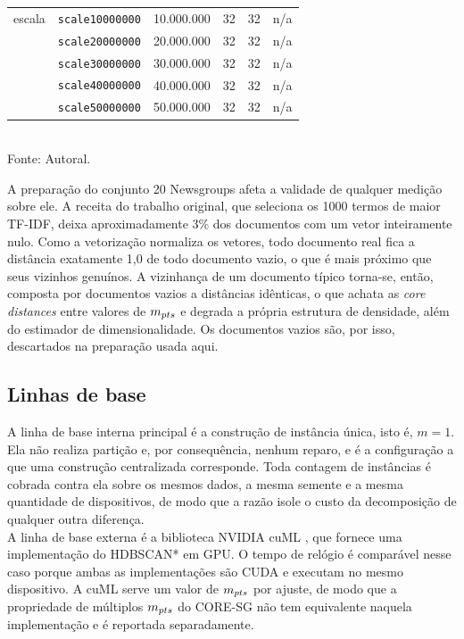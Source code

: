 \begin{table}[htb!]
\begin{tabular}{@{}llrrrr@{}}
\midrule
escala     & \texttt{scale10000000} & 10.000.000 & 32 & 32 & n/a \\
           & \texttt{scale20000000} & 20.000.000 & 32 & 32 & n/a \\
           & \texttt{scale30000000} & 30.000.000 & 32 & 32 & n/a \\
           & \texttt{scale40000000} & 40.000.000 & 32 & 32 & n/a \\
           & \texttt{scale50000000} & 50.000.000 & 32 & 32 & n/a \\
\bottomrule
\end{tabular}\\
Fonte: Autoral.
\end{table}

A preparação do conjunto 20 Newsgroups afeta a validade de qualquer medição sobre ele. A receita do trabalho original, que seleciona os 1000 termos de maior TF-IDF, deixa aproximadamente 3\% dos documentos com um vetor inteiramente nulo. Como a vetorização normaliza os vetores, todo documento real fica a distância exatamente 1,0 de todo documento vazio, o que é mais próximo que seus vizinhos genuínos. A vizinhança de um documento típico torna-se, então, composta por documentos vazios a distâncias idênticas, o que achata as \textit{core distances} entre valores de $m_{pts}$ e degrada a própria estrutura de densidade, além do estimador de dimensionalidade. Os documentos vazios são, por isso, descartados na preparação usada aqui.\\

\subsection{Linhas de base\label{sec:baselines}}

A linha de base interna principal é a construção de instância única, isto é, $m = 1$. Ela não realiza partição e, por consequência, nenhum reparo, e é a configuração a que uma construção centralizada corresponde. Toda contagem de instâncias é cobrada contra ela sobre os mesmos dados, a mesma semente e a mesma quantidade de dispositivos, de modo que a razão isole o custo da decomposição de qualquer outra diferença.\\

A linha de base externa é a biblioteca NVIDIA cuML \cite{cuml}, que fornece uma implementação do \ac{HDBSCAN*} em \ac{GPU}. O tempo de relógio é comparável nesse caso porque ambas as implementações são \ac{CUDA} e executam no mesmo dispositivo. A cuML serve um valor de $m_{pts}$ por ajuste, de modo que a propriedade de múltiplos $m_{pts}$ do \ac{CORE-SG} não tem equivalente naquela implementação e é reportada separadamente.\\

